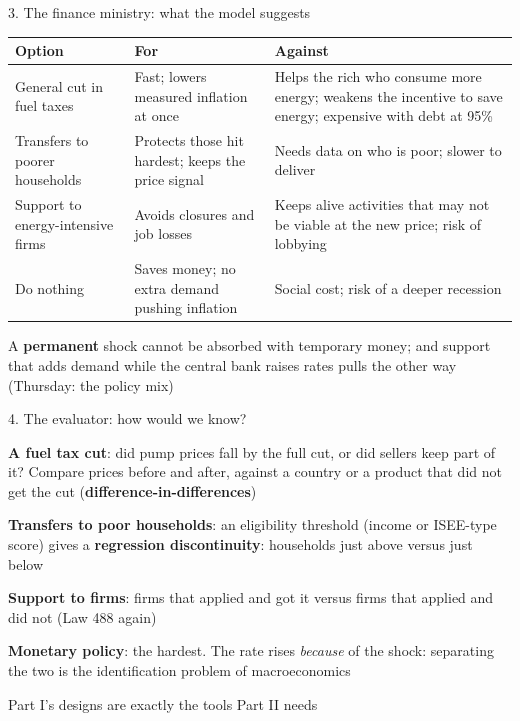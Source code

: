 \documentclass[aspectratio=169,xcolor=table]{beamer}
\begin{document}
\begin{frame}{3. The finance ministry: what the model suggests}
\scriptsize
\begin{tabular}{L{3.2cm}L{4.6cm}L{4.6cm}}
\toprule
\textbf{Option} & \textbf{For} & \textbf{Against} \\
\midrule
General cut in fuel taxes & Fast; lowers measured inflation at once & Helps the rich who consume more energy; weakens the incentive to save energy; expensive with debt at 95\% \\
Transfers to poorer households & Protects those hit hardest; keeps the price signal & Needs data on who is poor; slower to deliver \\
Support to energy-intensive firms & Avoids closures and job losses & Keeps alive activities that may not be viable at the new price; risk of lobbying \\
Do nothing & Saves money; no extra demand pushing inflation & Social cost; risk of a deeper recession \\
\bottomrule
\end{tabular}
\vspace{0.1cm}

\footnotesize
\bi
  \item A \textbf{permanent} shock cannot be absorbed with temporary money; and support that adds demand while the central bank raises rates pulls the other way (Thursday: the policy mix)
\ei
{}
\end{frame}

\begin{frame}{4. The evaluator: how would we know?}
\small
\bi
  \item \textbf{A fuel tax cut}: did pump prices fall by the full cut, or did sellers keep part of it? Compare prices before and after, against a country or a product that did not get the cut (\textbf{difference-in-differences})
  \item \textbf{Transfers to poor households}: an eligibility threshold (income or ISEE-type score) gives a \textbf{regression discontinuity}: households just above versus just below
  \item \textbf{Support to firms}: firms that applied and got it versus firms that applied and did not (Law 488 again)
  \item \textbf{Monetary policy}: the hardest. The rate rises \emph{because} of the shock: separating the two is the identification problem of macroeconomics
\ei
\vspace{0.1cm}
\begin{block}{}
\centering Part I's designs are exactly the tools Part II needs
\end{block}
\end{frame}
\end{document}

